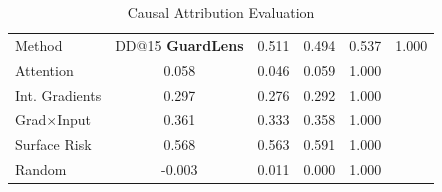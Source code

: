 \begin{table}[t]
\centering
\small
\caption{Causal Attribution Evaluation}
\label{tab:causal_eval}
\begin{tabular}{lcccc}
\toprule
Method & DD@15%
\midrule
\textbf{GuardLens} & 0.511 & 0.494 & 0.537 & 1.000 \\
Attention & 0.058 & 0.046 & 0.059 & 1.000 \\
Int. Gradients & 0.297 & 0.276 & 0.292 & 1.000 \\
Grad$\times$Input & 0.361 & 0.333 & 0.358 & 1.000 \\
Surface Risk & 0.568 & 0.563 & 0.591 & 1.000 \\
Random & -0.003 & 0.011 & 0.000 & 1.000 \\
\bottomrule
\end{tabular}
\end{table}